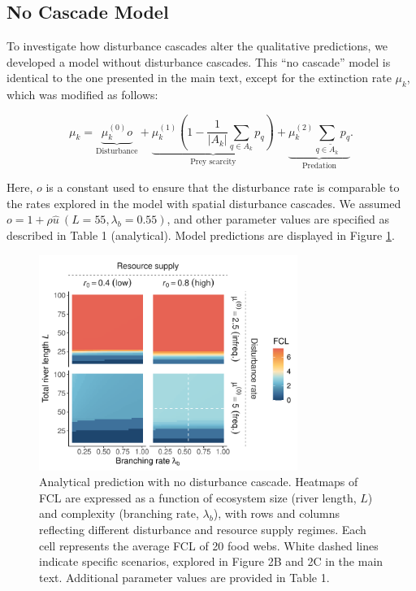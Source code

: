\documentclass[11pt, class=article, crop=false]{standalone}
\theoremstyle{definition}
\begin{document}
\newpage

\subsection{No Cascade Model}

To investigate how disturbance cascades alter the qualitative predictions, we developed a model without disturbance cascades.
This ``no cascade'' model is identical to the one presented in the main text, except for the extinction rate $\mu_k$, which was modified as follows:

\begin{equation}
    \mu_{k} = 
        \underbrace{\mu_{k}^{(0)} o}_{\text{Disturbance}} + 
        \underbrace{\mu_{k}^{(1)} \left(1 - \frac{1}{|A_k|}\sum_{q \in A_k} p_{q} \right)}_{\text{Prey scarcity}} + 
        \underbrace{\mu_{k}^{(2)} \sum_{q \in \tilde{A}_k} p_{q}}_{\text{Predation}}.
\end{equation}

Here, $o$ is a constant used to ensure that the disturbance rate is comparable to the rates explored in the model with spatial disturbance cascades.
We assumed $o = 1 + \rho \hat{u}~(L = 55, \lambda_b = 0.55)$, and other parameter values are specified as described in Table 1 (analytical).
Model predictions are displayed in Figure \ref{fig:no-cascade}.

\begin{figure}
\centering
\includegraphics[width=0.75\textwidth]{fig_theo_rho0.pdf}
\caption{Analytical prediction with no disturbance cascade. Heatmaps of
FCL are expressed as a function of ecosystem size (river length, \(L\))
and complexity (branching rate, \(\lambda_b\)), with rows and columns
reflecting different disturbance and resource supply regimes. Each cell
represents the average FCL of 20 food webs. White dashed lines indicate
specific scenarios, explored in Figure 2B and 2C in the main text.
Additional parameter values are provided in Table 1.}
\label{fig:no-cascade}
\end{figure}
\end{document}
